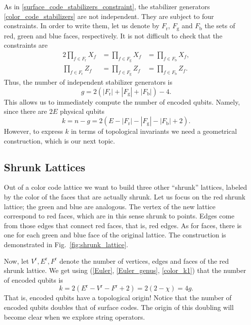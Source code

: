 \documentclass{article}
\newcommand{\fr}{F_{\mathrm{r}}}
\newcommand{\fg}{F_{\mathrm{g}}}
\newcommand{\fb}{F_{\mathrm{b}}}
\begin{document}
As in \eqref{surface_code_stabilizers_constraint}, the stabilizer generators \eqref{color_code_stabilizers} are not independent. They are subject to four constraints. In order to write them, let us denote by $\fr$, $\fg$ and $\fb$ the sets of red, green and blue faces, respectively. It is not difficult to check that the constraints are
\begin{alignat}{2}\label{color_code_stabilizers_constraint}
\prod_{f \in\fr} X_f&=\prod_{f \in\fg} X_f&=\prod_{f \in\fb} X_f,\nonumber\\
\prod_{f \in\fr} Z_f&=\prod_{f \in\fg} Z_f&=\prod_{f \in\fb} Z_f.
\end{alignat}
Thus, the number of independent stabilizer generators is
\begin{equation}\label{color_indep}
g=2(|\fr|+|\fg|+|\fb|)-4.
\end{equation}
This allows us to immediately compute the number of encoded qubits. Namely, since there are $2E$ physical qubits
\begin{equation}\label{color_k1}
k=n-g=2(E-|\fr|-|\fg|-|\fb|+2).
\end{equation}
However, to express $k$ in terms of topological invariants we need a geometrical construction, which is our next topic.


\subsection{Shrunk Lattices}

Out of a color code lattice we want to build three other ``shrunk'' lattices, labeled by the color of the faces that are actually shrunk. Let us focus on the red shrunk lattice; the green and blue are analogous. The vertex of the new lattice correspond to red faces, which are in this sense shrunk to points. Edges come from those edges that connect red faces, that is, red edges. As for faces, there is one for each green and blue face of the original lattice. The construction is demonstrated in Fig.~\ref{fig:shrunk_lattice}.

Now, let $V^\mathrm{r},E^\mathrm{r},F^\mathrm{r}$ denote the number of vertices, edges and faces of the red shrunk lattice. We get using (\ref{Euler}, \ref{Euler_genus}, \ref{color_k1}) that the number of encoded qubits is
\begin{equation}\label{}
k=2(E^\mathrm{r}-V^\mathrm{r}-F^\mathrm{r}+2)=2(2-\chi)=4g.
\end{equation}
That is, encoded qubits have a topological origin! Notice that the number of encoded qubits doubles that of surface codes. The origin of this doubling will become clear when we explore string operators.
\end{document}
